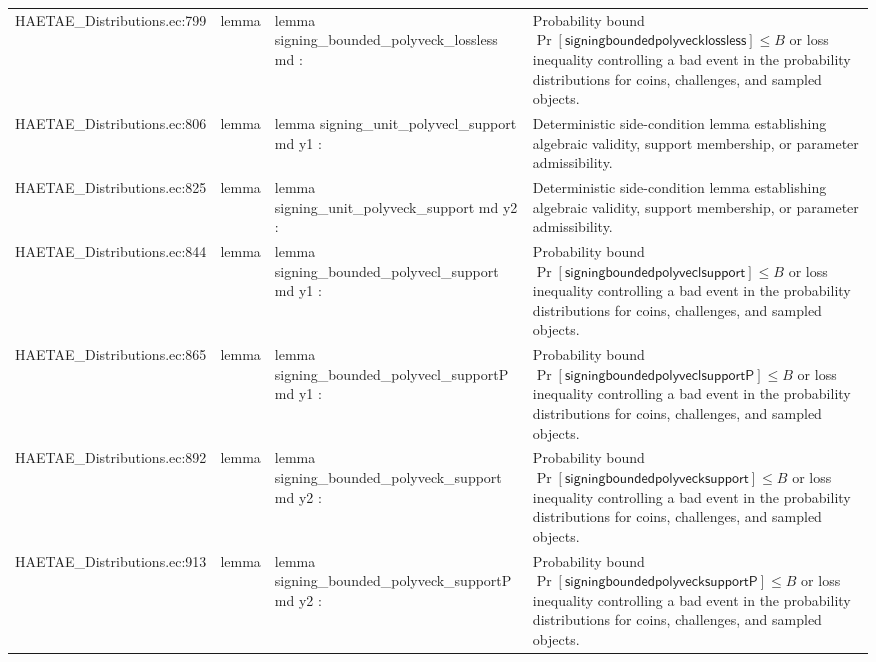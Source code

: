 \documentclass[10pt]{article}
\begin{document}
\begin{longtable}{L{0.11\textwidth}L{0.055\textwidth}L{0.385\textwidth}L{0.41\textwidth}}
HAETAE\_\allowbreak{}Distributions.\allowbreak{}ec:\allowbreak{}799 & lemma & {\ttfamily\scriptsize lemma signing\_\allowbreak{}bounded\_\allowbreak{}polyveck\_\allowbreak{}lossless md :} & Probability bound $\Pr[\mathsf{signingboundedpolyvecklossless}]\le B$ or loss inequality controlling a bad event in the probability distributions for coins, challenges, and sampled objects. \\
HAETAE\_\allowbreak{}Distributions.\allowbreak{}ec:\allowbreak{}806 & lemma & {\ttfamily\scriptsize lemma signing\_\allowbreak{}unit\_\allowbreak{}polyvecl\_\allowbreak{}support md y1 :} & Deterministic side-condition lemma establishing algebraic validity, support membership, or parameter admissibility. \\
HAETAE\_\allowbreak{}Distributions.\allowbreak{}ec:\allowbreak{}825 & lemma & {\ttfamily\scriptsize lemma signing\_\allowbreak{}unit\_\allowbreak{}polyveck\_\allowbreak{}support md y2 :} & Deterministic side-condition lemma establishing algebraic validity, support membership, or parameter admissibility. \\
HAETAE\_\allowbreak{}Distributions.\allowbreak{}ec:\allowbreak{}844 & lemma & {\ttfamily\scriptsize lemma signing\_\allowbreak{}bounded\_\allowbreak{}polyvecl\_\allowbreak{}support md y1 :} & Probability bound $\Pr[\mathsf{signingboundedpolyveclsupport}]\le B$ or loss inequality controlling a bad event in the probability distributions for coins, challenges, and sampled objects. \\
HAETAE\_\allowbreak{}Distributions.\allowbreak{}ec:\allowbreak{}865 & lemma & {\ttfamily\scriptsize lemma signing\_\allowbreak{}bounded\_\allowbreak{}polyvecl\_\allowbreak{}supportP md y1 :} & Probability bound $\Pr[\mathsf{signingboundedpolyveclsupportP}]\le B$ or loss inequality controlling a bad event in the probability distributions for coins, challenges, and sampled objects. \\
HAETAE\_\allowbreak{}Distributions.\allowbreak{}ec:\allowbreak{}892 & lemma & {\ttfamily\scriptsize lemma signing\_\allowbreak{}bounded\_\allowbreak{}polyveck\_\allowbreak{}support md y2 :} & Probability bound $\Pr[\mathsf{signingboundedpolyvecksupport}]\le B$ or loss inequality controlling a bad event in the probability distributions for coins, challenges, and sampled objects. \\
HAETAE\_\allowbreak{}Distributions.\allowbreak{}ec:\allowbreak{}913 & lemma & {\ttfamily\scriptsize lemma signing\_\allowbreak{}bounded\_\allowbreak{}polyveck\_\allowbreak{}supportP md y2 :} & Probability bound $\Pr[\mathsf{signingboundedpolyvecksupportP}]\le B$ or loss inequality controlling a bad event in the probability distributions for coins, challenges, and sampled objects. \\

\end{longtable}
\end{document}
